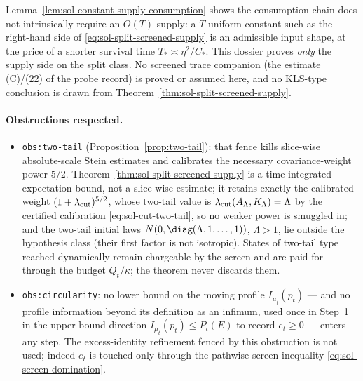 \documentclass[../main.tex]{subfiles}
\begin{document}
\begin{remark}
\label{rem:sol-no-companion}
Lemma~\ref{lem:sol-constant-supply-consumption} shows the consumption chain does not
intrinsically require an $O(T)$ supply: a $T$-uniform constant such as the right-hand side of
\eqref{eq:sol-split-screened-supply} is an admissible input shape, at the price of a shorter
survival time $T_*\asymp\eta^2/C_*$.  This dossier proves \emph{only} the supply side on the
split class.  No screened trace companion (the estimate (C)/(22) of the probe record) is
proved or assumed here, and no KLS-type conclusion is drawn from
Theorem~\ref{thm:sol-split-screened-supply}.
\end{remark}

\paragraph{Obstructions respected.}
\begin{itemize}
  \item \texttt{obs:two-tail} (Proposition~\ref{prop:two-tail}): that fence kills slice-wise
  absolute-scale Stein estimates and calibrates the necessary covariance-weight power $5/2$.
  Theorem~\ref{thm:sol-split-screened-supply} is a time-integrated expectation bound, not a
  slice-wise estimate; it retains exactly the calibrated weight
  $(1+\lambda_{\rm cut})^{5/2}$, whose two-tail value is
  $\lambda_{\rm cut}(A_\Lambda,K_\Lambda)=\Lambda$ by the certified calibration
  \eqref{eq:sol-cut-two-tail}, so no weaker power is smuggled in; and the two-tail initial
  laws $N(0,\diag(\Lambda,1,\dots,1))$, $\Lambda>1$, lie outside the hypothesis class (their
  first factor is not isotropic).  States of two-tail type reached dynamically remain
  chargeable by the screen and are paid for through the budget $Q_t/\kappa$; the theorem
  never discards them.
  \item \texttt{obs:circularity}: no lower bound on the moving profile
  $I_{\mu_t}(p_t)$ — and no profile information beyond its definition as an infimum, used
  once in Step~1 in the upper-bound direction $I_{\mu_t}(p_t)\le P_t(E)$ to record
  $e_t\ge0$ — enters any step.  The excess-identity refinement fenced by this obstruction is
  not used; indeed $e_t$ is touched only through the pathwise screen inequality
  \eqref{eq:sol-screen-domination}.
\end{itemize}

\end{document}
